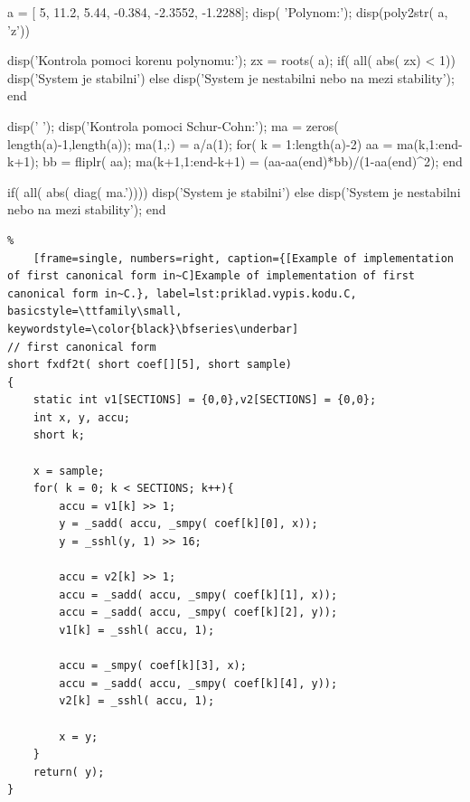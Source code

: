 \begin{matlab}%
	[frame=single, float=htbp, caption={[Example of the Schur--Cohn test of stability in Matlab]Example of the Schur--Cohn test of stability in Matlab.}, label=lst:priklad.vypis.kodu.Matlab, numberstyle=\scriptsize, numbersep=7pt]

a = [ 5, 11.2, 5.44, -0.384, -2.3552, -1.2288];
disp( 'Polynom:'); disp(poly2str( a, 'z'))

disp('Kontrola pomoci korenu polynomu:');
zx = roots( a);
if( all( abs( zx) < 1))
    disp('System je stabilni')
else
    disp('System je nestabilni nebo na mezi stability');
end

disp(' '); disp('Kontrola pomoci Schur-Cohn:');
ma = zeros( length(a)-1,length(a));
ma(1,:) = a/a(1);
for( k = 1:length(a)-2)
    aa = ma(k,1:end-k+1);
    bb = fliplr( aa);
    ma(k+1,1:end-k+1) = (aa-aa(end)*bb)/(1-aa(end)^2);
end

if( all( abs( diag( ma.'))))
    disp('System je stabilni')
else
    disp('System je nestabilni nebo na mezi stability');
end
\end{matlab}

\noindent
\begin{minipage}{\linewidth}



\begin{lstlisting}%
	[frame=single, numbers=right, caption={[Example of implementation of first canonical form in~C]Example of implementation of first canonical form in~C.}, label=lst:priklad.vypis.kodu.C, basicstyle=\ttfamily\small, keywordstyle=\color{black}\bfseries\underbar]
// first canonical form
short fxdf2t( short coef[][5], short sample)
{
	static int v1[SECTIONS] = {0,0},v2[SECTIONS] = {0,0};
	int x, y, accu;
	short k;

	x = sample;
	for( k = 0; k < SECTIONS; k++){
		accu = v1[k] >> 1;
		y = _sadd( accu, _smpy( coef[k][0], x));
		y = _sshl(y, 1) >> 16;

		accu = v2[k] >> 1;
		accu = _sadd( accu, _smpy( coef[k][1], x));
		accu = _sadd( accu, _smpy( coef[k][2], y));
		v1[k] = _sshl( accu, 1);

		accu = _smpy( coef[k][3], x);
		accu = _sadd( accu, _smpy( coef[k][4], y));
		v2[k] = _sshl( accu, 1);

		x = y;
	}
	return( y);
}
\end{lstlisting}
\end{minipage}



